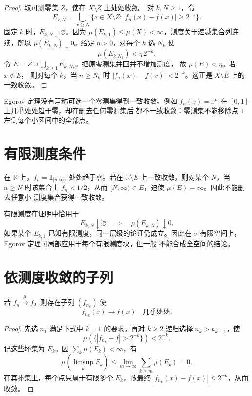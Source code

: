 \begin{proof}
取可测零集 \(Z\)，使在 \(X\setminus Z\) 上处处收敛。
对 \(k,N\ge1\)，令
\[
 E_{k,N}=\bigcup_{n\ge N}\{x\in X\setminus Z:|f_n(x)-f(x)|\ge2^{-k}\}.
\]
固定 \(k\) 时，\(E_{k,N}\downarrow\varnothing\)。因为
\(\mu(E_{k,1})\le\mu(X)<\infty\)，测度关于递减集合列连续，所以
\(\mu(E_{k,N})\downarrow0\)。给定 \(\eta>0\)，对每个 \(k\) 选
\(N_k\) 使
\[
 \mu(E_{k,N_k})<\eta\,2^{-k}.
\]
令 \(E=Z\cup\bigcup_{k\ge1}E_{k,N_k}\)。把原零测集并回并不增加测度，
故 \(\mu(E)<\eta\)。若 \(x\notin E\)，
则对每个 \(k\)，当 \(n\ge N_k\) 时
\(|f_n(x)-f(x)|<2^{-k}\)。这正是 \(X\setminus E\) 上的一致收敛。
\end{proof}

Egorov 定理没有声称可选一个零测集得到一致收敛。例如
\(f_n(x)=x^n\) 在 \([0,1]\) 上几乎处处趋于零，却在删去任何零测集后
都不一致收敛：零测集不能移除点 \(1\) 左侧每个小区间中的全部点。

\section{有限测度条件}

在 \(\mathbb R\) 上，\(f_n=\mathbf1_{[n,\infty)}\) 处处趋于零。若在
\(\mathbb R\setminus E\) 上一致收敛，则对某个 \(N\)，当 \(n\ge N\)
时该集合上 \(f_n<1/2\)，从而
\([N,\infty)\subset E\)，迫使 \(\mu(E)=\infty\)。因此不能删去任意小
测度集合获得一致收敛。

有限测度在证明中恰用于
\[
 E_{k,N}\downarrow\varnothing
\quad\Longrightarrow\quad
\mu(E_{k,N})\downarrow0.
\]
如果某个 \(E_{k,1}\) 已知有限测度，同一层级的论证仍成立。因此在
\(\sigma\)-有限空间上，Egorov 定理可局部应用于每个有限测度块，但一般
不能合成全空间的结论。

\section{依测度收敛的子列}

\begin{theorem}[子列原理]
\label{thm:measure-convergence-subsequence}
若 \(f_n\xrightarrow{\mu}f\)，则存在子列
\((f_{n_k})\) 使
\[
 f_{n_k}(x)\longrightarrow f(x)
\quad\text{几乎处处}.
\]
\end{theorem}

\begin{proof}
先选 \(n_1\) 满足下式中 \(k=1\) 的要求，再对 \(k\ge2\) 递归选择
\(n_k>n_{k-1}\)，使
\[
 \mu(\{|f_{n_k}-f|>2^{-k}\})<2^{-k}.
\]
记这些坏集为 \(E_k\)。因 \(\sum_k\mu(E_k)<\infty\)，有
\[
 \mu(\limsup_kE_k)
 \le\lim_{m\to\infty}\sum_{k\ge m}\mu(E_k)=0.
\]
在其补集上，每个点只属于有限多个 \(E_k\)，故最终
\(|f_{n_k}(x)-f(x)|\le2^{-k}\)，从而收敛。
\end{proof}


